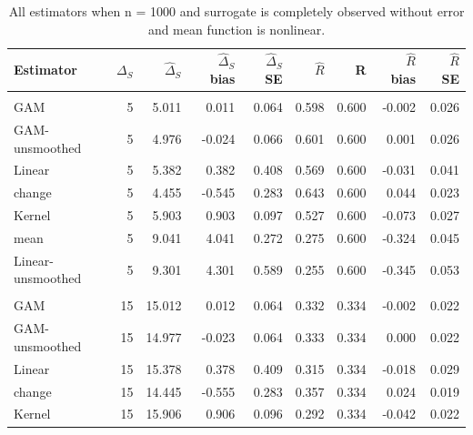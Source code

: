 \documentclass[useAMS,usenatbib,referee]{biom}
\begin{document}
\begin{table}[t]

\caption{\label{tab:oracle-large-n-nl}All estimators when n = 1000 and surrogate is completely observed without error and mean function is nonlinear.}
\centering
\begin{tabular}{lrrrrrrrr}
\toprule
Estimator & $\Delta_S$ & $\widehat{\Delta}_S$ & $\widehat{\Delta}_S$ bias & $\widehat{\Delta}_S$ SE & $\widehat{R}$ & R & $\widehat{R}$ bias & $\widehat{R}$ SE\\
\midrule
\addlinespace[0.3em]
\multicolumn{9}{l}{\textbf{Small residual effect}}\\
\hspace{1em}GAM & 5 & 5.011 & 0.011 & 0.064 & 0.598 & 0.600 & -0.002 & 0.026\\
\hspace{1em}GAM-unsmoothed & 5 & 4.976 & -0.024 & 0.066 & 0.601 & 0.600 & 0.001 & 0.026\\
\hspace{1em}Linear & 5 & 5.382 & 0.382 & 0.408 & 0.569 & 0.600 & -0.031 & 0.041\\
\hspace{1em}change & 5 & 4.455 & -0.545 & 0.283 & 0.643 & 0.600 & 0.044 & 0.023\\
\hspace{1em}Kernel & 5 & 5.903 & 0.903 & 0.097 & 0.527 & 0.600 & -0.073 & 0.027\\
\hspace{1em}mean & 5 & 9.041 & 4.041 & 0.272 & 0.275 & 0.600 & -0.324 & 0.045\\
\hspace{1em}Linear-unsmoothed & 5 & 9.301 & 4.301 & 0.589 & 0.255 & 0.600 & -0.345 & 0.053\\
\addlinespace[0.3em]
\multicolumn{9}{l}{\textbf{Medium residual effect}}\\
\hspace{1em}GAM & 15 & 15.012 & 0.012 & 0.064 & 0.332 & 0.334 & -0.002 & 0.022\\
\hspace{1em}GAM-unsmoothed & 15 & 14.977 & -0.023 & 0.064 & 0.333 & 0.334 & 0.000 & 0.022\\
\hspace{1em}Linear & 15 & 15.378 & 0.378 & 0.409 & 0.315 & 0.334 & -0.018 & 0.029\\
\hspace{1em}change & 15 & 14.445 & -0.555 & 0.283 & 0.357 & 0.334 & 0.024 & 0.019\\
\hspace{1em}Kernel & 15 & 15.906 & 0.906 & 0.096 & 0.292 & 0.334 & -0.042 & 0.022\\

\end{tabular}
\end{table}
\end{document}
